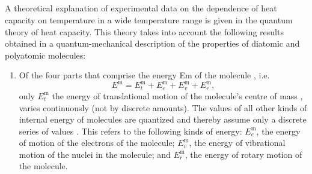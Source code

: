 \subsection{}\label{10.7.3} A theoretical explanation of experimental data on the dependence of heat capacity on temperature in a wide tem­perature range is given in the quantum theory of heat capacity. This theory takes into account the following results obtained in a quantum-mechanical description of the properties of diatomic and polyatomic molecules:
\begin{enumerate}[label=(\alph*)]
\item Of the four parts that comprise the energy Em of the molecule  , i.e.
\begin{equation*}%
E^{\text{m}} = E_{t}^{\text{m}}+ E_{e}^{\text{m}} + E_{v}^{\text{m}} + E_{r}^{\text{m}},
\end{equation*}
only $E_{t}^{\text{m}}$ the energy of translational motion of the molecule's
centre of mass , varies continuously (not by discrete amounts). The values of all other kinds of internal energy of molecules are quantized and thereby assume only a discrete series of values . This refers to the following kinds of energy: $E_{e}^{\text{m}}$, the energy of motion of the electrons of the mole­cule; $E_{v}^{\text{m}}$, the energy of vibrational motion of the nuclei in the molecule; and $E_{r}^{\text{m}}$, the energy of rotary motion of the molecule. 


\end{enumerate}
